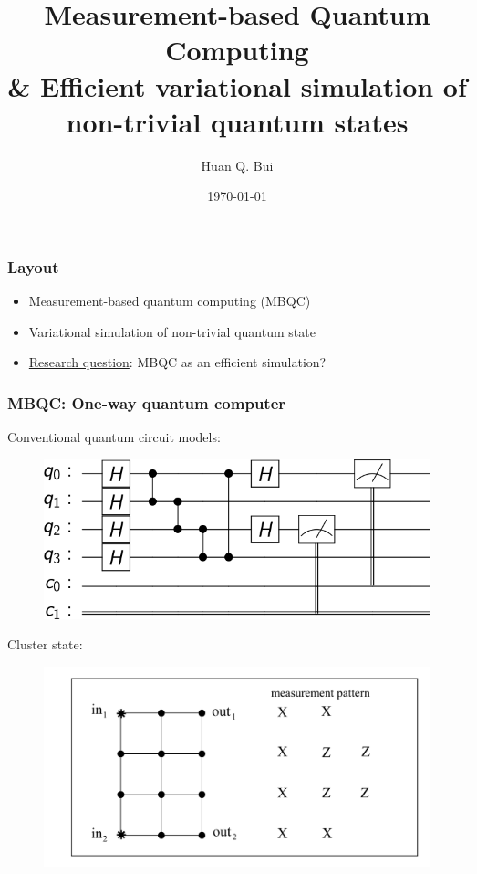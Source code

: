 \documentclass{beamer}
\title{Measurement-based Quantum Computing \\ \& Efficient variational simulation of non-trivial quantum states}
\author[Huan Q. Bui] %
{Huan Q. Bui}
\institute[Perimeter Institute] %
{
	
	Advisor: Timothy Hsieh
	\and
	Perimeter Institute for Theoretical Physics
}
\date{\today}
\theoremstyle{definition}
\begin{document}
 
\frame{\titlepage}




\begin{frame}

\frametitle{Layout}

\begin{itemize}
	\item Measurement-based quantum computing (MBQC)
	
	\item Variational simulation of non-trivial quantum state
	
	\item \underline{Research question}: MBQC as an efficient simulation?
\end{itemize}

\end{frame}





\begin{frame}
\frametitle{MBQC: One-way quantum computer \cite{MBQC}}

Conventional quantum circuit models:

\begin{figure}[!htb]
	\includegraphics[scale=0.25]{circuit}
\end{figure}

Cluster state: \cite{jozsa}

\begin{figure}[!htb]
	\includegraphics[scale=0.18]{fig8}
\end{figure}







\end{frame}
\end{document}

